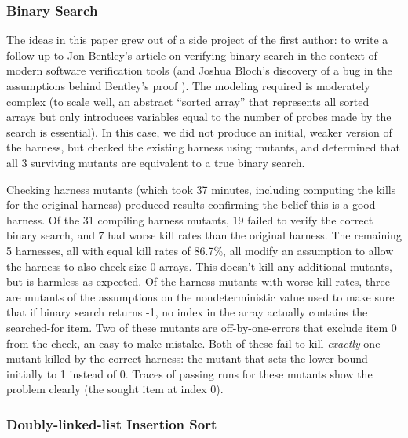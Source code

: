 \documentclass{svjour3}
\begin{document}
\subsubsection{Binary Search}

The ideas in this paper grew out of a side project of the first
author: to write a follow-up to Jon Bentley's article on verifying
binary search \cite{Bentley} in the context of modern software
verification tools (and Joshua Bloch's discovery of a bug in the
assumptions behind Bentley's proof \cite{Bloch}).  The modeling
required is moderately complex (to scale well, an abstract ``sorted
array'' that represents all sorted arrays but only introduces
variables equal to the number of probes made by the search is
essential).  In this case, we did not produce an initial, weaker
version of the harness, but checked the existing harness using
mutants, and determined that all 3 surviving mutants are equivalent to
a true binary search.

Checking harness mutants (which took 37 minutes, including computing
the kills for the original harness) produced results confirming the belief this is a
good harness.  Of the 31 compiling harness mutants, 19 failed to verify
the correct binary search, and 7 had worse kill rates than the
original harness.  The remaining 5 harnesses, all with equal kill
rates of 86.7\%, all modify an assumption to allow the harness to also
check size 0 arrays.  This doesn't kill any additional mutants, but is
harmless as expected.  Of the harness mutants with worse kill rates,
three are mutants of the assumptions on the nondeterministic value used to
make sure that if binary search returns -1, no index in the array
actually contains the searched-for item.  Two of these mutants are
off-by-one-errors that exclude item 0 from the check, an easy-to-make
mistake.  Both of these fail to kill \emph{exactly} one mutant killed by the
correct harness: the mutant that sets the lower bound
initially to 1 instead of 0.  Traces of passing runs for these mutants show the
problem clearly (the sought item at index 0).

\subsubsection{Doubly-linked-list Insertion Sort}
\end{document}
